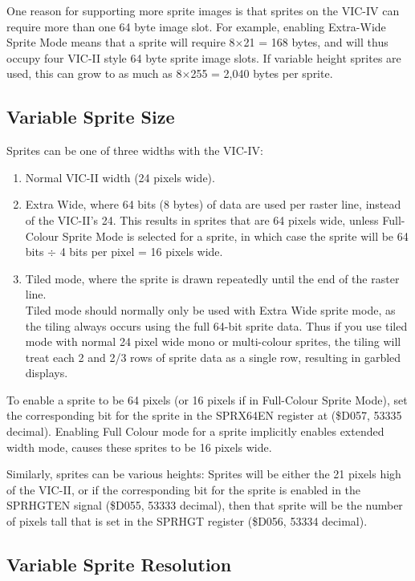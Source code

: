 One reason for supporting more sprite images is that sprites on the VIC-IV can require more than one 64 byte image slot.
For example, enabling Extra-Wide Sprite Mode means that a sprite will require 8$\times$21 = 168 bytes, and will thus occupy
four VIC-II style 64 byte sprite image slots.  If variable height sprites are used, this can grow to as much as  8$\times$255 = 2,040 bytes per sprite.

\subsection{Variable Sprite Size}

Sprites can be one of three widths with the VIC-IV:

\begin{enumerate}
\item Normal VIC-II width (24 pixels wide).
\item Extra Wide, where 64 bits (8 bytes) of data are used per raster line, instead of the VIC-II's 24.
  This results in sprites that are 64 pixels wide, unless Full-Colour Sprite Mode is selected for a sprite,
  in which case the sprite will be 64 bits $\div$ 4 bits per pixel = 16 pixels wide.
\item Tiled mode, where the sprite is drawn repeatedly until the end of the raster line. \\
  Tiled mode should normally only be used with Extra Wide sprite mode, as the tiling always occurs using the full
64-bit sprite data. Thus if you use tiled mode with normal 24 pixel wide mono or multi-colour sprites, the tiling will treat each 2 and 2/3 rows of sprite data as a single row, resulting in garbled displays.
\end{enumerate}

To enable a sprite to be 64 pixels (or 16 pixels if in Full-Colour Sprite Mode), set the corresponding bit for the sprite in the SPRX64EN register at (\$D057, 53335 decimal).  Enabling Full Colour mode for a sprite implicitly enables extended width mode, causes these sprites to be 16 pixels wide.

Similarly, sprites can be various heights:  Sprites will be either the 21 pixels high of the VIC-II, or if the corresponding bit for the sprite is enabled in the SPRHGTEN signal (\$D055, 53333 decimal), then that sprite will be the number of pixels tall that is set in the SPRHGT
register (\$D056, 53334 decimal).

\subsection{Variable Sprite Resolution}

